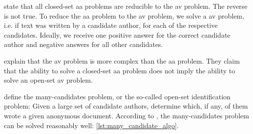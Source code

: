 \citet{koppel_determining_2014} state that all closed-set \ac{aa} problems are reducible to the \ac{av} problem.
The reverse is not true.
To reduce the \ac{aa} problem to the \ac{av} problem, we solve a \ac{av} problem, i.e. if text was written by a candidate author, 
for each of the respective candidates.
Ideally, we receive one positive answer for the correct candidate author and negative answers for all other candidates.

\citet{koppel_determining_2014} explain that the \ac{av} problem is more complex than the \ac{aa} problem.
They claim that the ability to solve a closed-set \ac{aa} problem does not imply the ability to solve an open-set \ac{av} problem.

\citet{koppel_determining_2014} define the many-candidates problem, or the so-called open-set identification problem:
Given a large set of candidate authors, determine which, if any, of them wrote a given anonymous document.
According to \citet{koppel_determining_2014}, the many-candidates problem can be solved reasonably well: \autoref{lst:many_candidate_algo}.